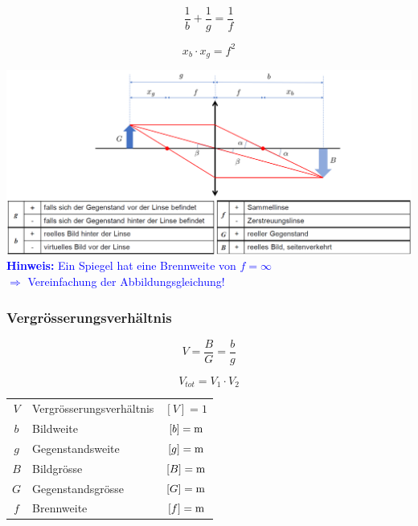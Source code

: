 \begin{minipage}{0.48\linewidth}

$$ \boxed{ \frac{1}{b} + \frac{1}{g} = \frac{1}{f} } $$
\end{minipage}
\hfill
\begin{minipage}{0.48\linewidth}

$$ \boxed{ x_b \cdot x_g = f^2 } $$
\end{minipage}


\includegraphics[width=\linewidth]{Bilder/Wellen-Optik/abbildungsgleichung}  \\

\textcolor{blue}{ \textbf{Hinweis:} Ein Spiegel hat eine Brennweite von $f = \infty$ \\
$\Rightarrow$ Vereinfachung der Abbildungsgleichung!}


\subsubsection{Vergrösserungsverhältnis}

\begin{minipage}{0.48\linewidth}
$$ \boxed{ V = \frac{B}{G} = \frac{b}{g} } $$
\end{minipage}
\hfill
\begin{minipage}{0.48\linewidth}
$$ \boxed{ V_{tot} = V_1 \cdot V_2 } $$ 
\end{minipage}

\vspace{0.2cm}



\begin{tabular}{c l c}
	$V$ & Vergrösserungsverhältnis & $[V] = 1$ \\
	$b$ & Bildweite & $[b] = \mathrm{m}$ \\
	$g$ & Gegenstandsweite & $[g] = \mathrm{m}$ \\
	$B$ & Bildgrösse & $[B] = \mathrm{m}$ \\
	$G$ & Gegenstandsgrösse & $[G] = \mathrm{m}$ \\
	$f$ & Brennweite & $[f] = \mathrm{m}$ 
\end{tabular}





